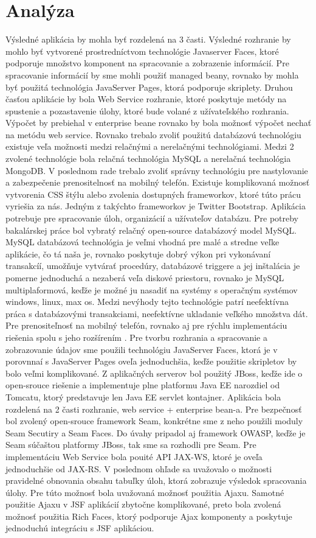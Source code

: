 \section{Analýza}
Výsledné aplikácia by mohla byť rozdelená na 3 časti. Výsledné rozhranie by mohlo byť vytvorené prostredníctvom technológie Javaserver Faces, ktoré podporuje množstvo komponent na spracovanie a zobrazenie informácií. Pre spracovanie informácií by sme mohli použiť managed beany, rovnako by mohla byť použitá technológia JavaServer Pages, ktorá podporuje skriplety. Druhou časťou aplikácie by bola Web Service rozhranie, ktoré poskytuje metódy na spustenie a pozastavenie úlohy, ktoré bude volané z užívateľského rozhrania. Výpočet by prebiehal v enterprise beane rovnako by bola možnosť výpočet nechať na metódu web service. Rovnako trebalo zvoliť použitú databázovú technológiu existuje veľa možnosti medzi relačnými a nerelačnými technológiami. Medzi 2 zvolené technológie bola relačná technológia MySQL a nerelačná technológia MongoDB. V poslednom rade trebalo zvoliť správny technológiu pre nastylovanie a zabezpečenie prenositelnosť na mobilný telefón. Existuje komplikovaná možnosť  vytvorenia CSS štýlu alebo zvolenia dostupných frameworkov, ktoré túto prácu vyriešia za nás. Jedným z takýchto frameworkov je Twitter Bootstrap. Aplikácia potrebuje pre spracovanie úloh, organizácií a užívateľov databázu. Pre potreby bakalárskej práce bol vybratý relačný open-source databázový model MySQL. MySQL databázová technológia je veľmi vhodná pre malé a stredne veľke aplikácie, čo tá naša je, rovnako poskytuje dobrý výkon pri vykonávaní transakcíí, umožňuje vytvárať procedúry, databázové triggere a jej inštalácia je pomerne jednoduchá a nezaberá veľa diskové priestoru, rovnako je MySQL multiplaformová, keďže je možné ju nasadiť na systémy s operačným systémov windows, linux, max os. Medzi nevýhody tejto technológie patrí neefektívna práca s databázovými transakciami, neefektívne ukladanie veľkého množstva dát. Pre prenositeľnosť na mobilný telefón, rovnako aj pre rýchlu implementáciu riešenia spolu s jeho rozšírením . Pre tvorbu rozhrania a spracovanie a zobrazovanie údajov sme použili technológiu JavaServer Faces, ktorá je v porovnnaí s JavaServer Pages oveľa jednoduchšia, keďže použitie skripletov by bolo veľmi komplikované. Z aplikačných serverov bol použitý JBoss, keďže ide o open-srouce riešenie a implementuje plne platformu Java EE narozdiel od Tomcatu, ktorý predstavuje len Java EE servlet kontajner. Aplikácia bola rozdelená na 2 časti rozhranie, web service + enterprise bean-a. Pre bezpečnosť bol zvolený open-srouce framework Seam, konkrétne sme z neho použili moduly Seam Secutiry a Seam Faces. Do úvahy pripadol aj framework OWASP, keďže je Seam súčaštou platformy JBoss, tak sme sa rozhodli pre Seam. Pre implementáciu Web Service bola pouité API JAX-WS, ktoré je oveľa jednoduchšie od JAX-RS. V poslednom ohľade sa uvažovalo o možnosti pravidelné obnovania obsahu tabuľky úloh, ktorá zobrazuje výsledok spracovania úlohy. Pre túto možnosť bola uvažovaná možnosť použitia Ajaxu. Samotné použitie Ajaxu v JSF aplikácií zbytočne komplikované, preto bola zvolená možnosť použitia Rich Faces, ktorý podporuje Ajax komponenty a poskytuje jednoduchú integráciu s JSF aplikáciou.


